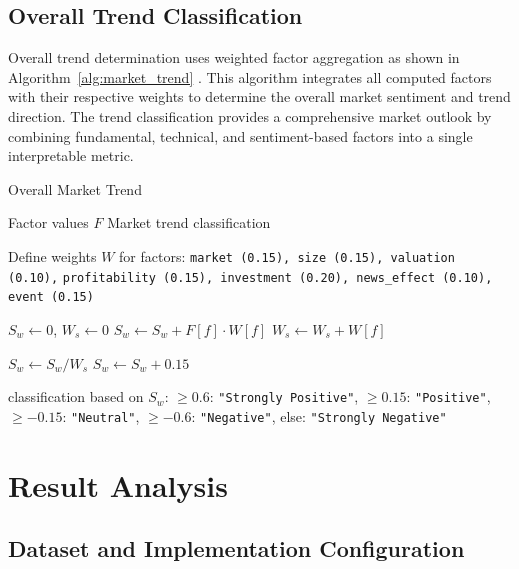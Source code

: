\documentclass[3p,times,procedia]{elsarticle}
\begin{document}
\subsection{Overall Trend Classification}
Overall trend determination uses weighted factor aggregation as shown in Algorithm~\ref{alg:market_trend} \cite{Carhart1997}. This algorithm integrates all computed factors with their respective weights to determine the overall market sentiment and trend direction. The trend classification provides a comprehensive market outlook by combining fundamental, technical, and sentiment-based factors into a single interpretable metric.

\begin{algorithm}[H]
\caption{Overall Market Trend}
\label{alg:market_trend}
\begin{algorithmic}[1]
    \Require Factor values $F$
    \Ensure Market trend classification
    
    \State Define weights $W$ for factors: \texttt{market (0.15), size (0.15), valuation (0.10),}
    \Statex \hspace{8mm} \texttt{profitability (0.15), investment (0.20), news\_effect (0.10), event (0.15)}
    
    \State $S_w \gets 0$, $W_s \gets 0$
            \State $S_w \gets S_w + F[f] \cdot W[f]$
            \State $W_s \gets W_s + W[f]$
        \EndIf
    \EndFor
    
     \State $S_w \gets S_w / W_s$ \EndIf
    \State $S_w \gets S_w + 0.15$ 

    \State \Return classification based on $S_w$: 
    \Statex \hspace{4mm} $\geq 0.6$: \texttt{"Strongly Positive"}, 
    $\geq 0.15$: \texttt{"Positive"},
    \Statex \hspace{4mm} $\geq -0.15$: \texttt{"Neutral"},
    $\geq -0.6$: \texttt{"Negative"}, else: \texttt{"Strongly Negative"}
\end{algorithmic}
\end{algorithm}

\vspace{0.5cm}
\section{Result Analysis}

\subsection{Dataset and Implementation Configuration}
\end{document}
